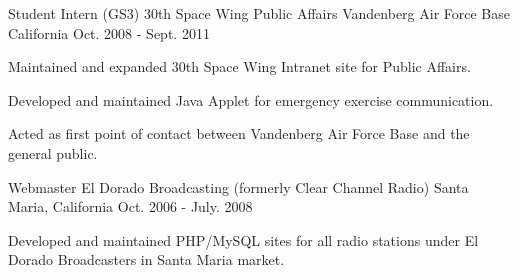 \begin{cventries}
  \cventry
    {Student Intern (GS3)} %
    {30th Space Wing Public Affairs} %
    {Vandenberg Air Force Base California} %
    {Oct. 2008 - Sept. 2011} %
    {
      \begin{cvitems} %
        \item {Maintained and expanded 30th Space Wing Intranet site for Public Affairs.}
        \item {Developed and maintained Java Applet for emergency exercise communication.}
        \item {Acted as first point of contact between Vandenberg Air Force Base and the general public.}
      \end{cvitems}
    }

  \cventry
    {Webmaster} %
    {El Dorado Broadcasting (formerly Clear Channel Radio)} %
    {Santa Maria, California} %
    {Oct. 2006 - July. 2008} %
    {
      \begin{cvitems} %
        \item {Developed and maintained PHP/MySQL sites for all radio stations under El Dorado Broadcasters in Santa Maria market.}
      \end{cvitems}
    }





\end{cventries}
